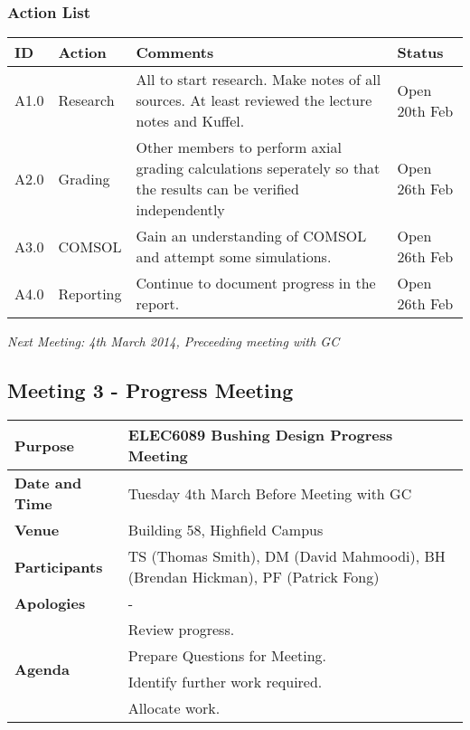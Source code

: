 \subsubsection{Action List}
\begin{center}
\begin{longtable}{| p{} | >{\raggedright\arraybackslash}p{} |  p{} | >{\raggedright\arraybackslash}p{}|} \hline
\textbf{ID} & \textbf{Action} & \textbf{Comments} & \textbf{Status} \\ \hline
\endhead
A1.0	&	Research	&	All to start research. Make notes of all sources. At least reviewed the lecture notes and Kuffel.	& Open 20th Feb \\ \hline
A2.0	&	Grading	&	Other members to perform axial grading calculations seperately so that the results can be verified independently	& Open 26th Feb \\ \hline
A3.0	&	COMSOL	&	Gain an understanding of COMSOL and attempt some simulations. & Open 26th Feb \\ \hline
A4.0	&	Reporting	&	Continue to document progress in the report.	&	Open 26th Feb \\ \hline
	
\end{longtable}
\end{center}

\emph{Next Meeting: 4th March 2014, Preceeding meeting with GC}

\subsection{Meeting 3 - Progress Meeting}
\begin{center}
\begin{longtable}{| m{} | m{} |} \hline
\textbf{Purpose} & ELEC6089 Bushing Design Progress Meeting \\ \hline
\textbf{Date and Time} & Tuesday 4th March Before Meeting with GC \\ \hline
\textbf{Venue} & Building 58, Highfield Campus \\ \hline
\textbf{Participants} & TS (Thomas Smith), DM (David Mahmoodi), BH (Brendan Hickman), PF (Patrick Fong)\\ \hline
\textbf{Apologies} & - \\ \hline
\multirow{4}{*}{\textbf{Agenda}} & Review progress. \\
 & Prepare Questions for Meeting. \\ 
 & Identify further work required. \\
 & Allocate work. \\ \hline
\end{longtable}
\end{center}

